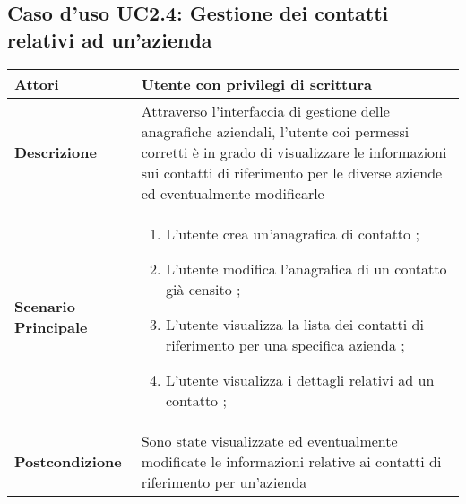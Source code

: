 	\subsection{Caso d'uso UC2.4: Gestione dei contatti relativi ad un'azienda}
	\begin{longtable}{ | p{2.7cm} | p{12cm} |}
		\hline \textbf{Attori} & Utente con privilegi di scrittura\\ 
		\hline \textbf{Descrizione} & Attraverso l’interfaccia di gestione delle anagrafiche aziendali, l’utente coi permessi corretti è in grado di visualizzare le informazioni sui contatti di riferimento per le diverse aziende ed eventualmente modificarle\\ 
		\hline \textbf{Scenario Principale} & \begin{enumerate}
			\item L’utente crea un’anagrafica di contatto ;
			\item L’utente modifica l’anagrafica di un contatto già censito ;
			\item L’utente visualizza la lista dei contatti di riferimento per una specifica azienda ;
			\item L’utente visualizza i dettagli relativi ad un contatto ;
			
		\end{enumerate}
		\\ 
		\hline \textbf{Postcondizione} & Sono state visualizzate ed eventualmente modificate le informazioni relative ai contatti di riferimento per un’azienda\\ 
		\hline 
	\end{longtable}
	
	\hypertarget{UC3}{}
